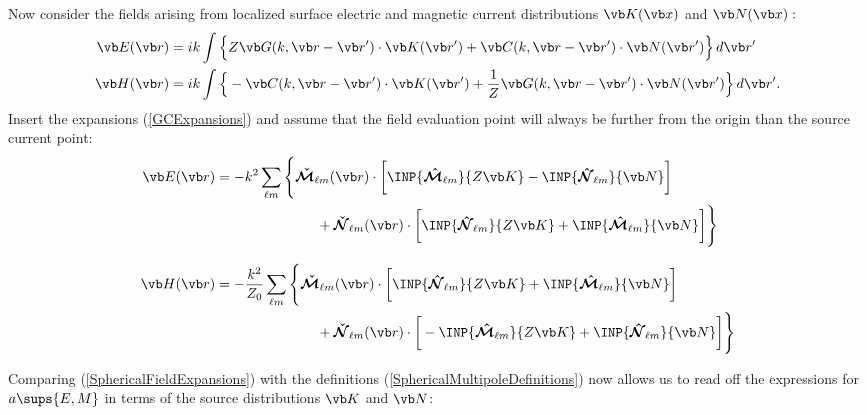 Now consider the fields arising from localized surface electric
and magnetic current distributions $\vb K(\vb x)$ and $\vb N(\vb x):$
\begin{align*}
 \vb E(\vb r) 
&= 
   ik\int \Big\{ Z\vb G(k, \vb r-\vb r^\prime) \cdot \vb K(\vb r^\prime)
                 +\vb C(k, \vb r-\vb r^\prime) \cdot \vb N(\vb r^\prime)
          \Big\} \, d\vb r^\prime
\\
 \vb H(\vb r) 
&= 
   ik\int \Big\{ -\vb C(k, \vb r-\vb r^\prime) \cdot \vb K(\vb r^\prime)
                 +\frac{1}{Z}\vb G(k, \vb r-\vb r^\prime) \cdot \vb N(\vb r^\prime)
          \Big\}\,d\vb r^\prime.
\end{align*}
Insert the expansions (\ref{GCExpansions}) and assume that the 
field evaluation point will always be further from the origin than
the source current point: 
\begin{subequations}
\begin{align*}
 \vb E(\vb r) 
&= 
 -k^2 \sum_{\ell m} 
       \Bigg\{ \BMMExt_{\ell m}(\vb r) \cdot 
               \bigg[   \INP{ \BMMInt_{\ell m} }{Z \vb K}
                      - \INP{ \BNNInt_{\ell m} }{\vb N}
               \bigg]
\\
&\hspace{1.0in}
             + \BNNExt_{\ell m}(\vb r) \cdot 
               \bigg[   \INP{ \BNNInt_{\ell m} }{Z \vb K}
                      + \INP{ \BMMInt_{\ell m} }{\vb N}
               \bigg]
       \Bigg\}
\\[8pt]
 \vb H(\vb r) 
&= -\frac{k^2}{Z_0} \sum_{\ell m} 
       \Bigg\{ \BMMExt_{\ell m}(\vb r) \cdot 
               \bigg[   \INP{ \BNNInt_{\ell m} }{Z\vb K}
                      + \INP{ \BMMInt_{\ell m} }{\vb N}
               \bigg]
\\
&\hspace{1.0in}
             + \BNNExt_{\ell m}(\vb r) \cdot 
               \bigg[ - \INP{ \BMMInt_{\ell m} }{Z\vb K}
                      + \INP{ \BNNInt_{\ell m} }{\vb N}
               \bigg]
       \Bigg\}
\end{align*}
\label{SphericalFieldExpansions}
\end{subequations}

Comparing (\ref{SphericalFieldExpansions}) with the definitions
(\ref{SphericalMultipoleDefinitions}) now allows us to read off
the expressions for $a\sups{E,M}$ in terms of the source
distributions $\vb K$ and $\vb N$: 

